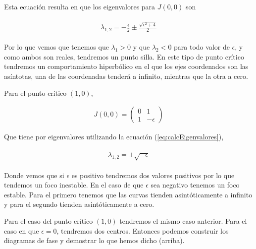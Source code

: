 \documentclass[a4paper,10pt]{article}
\begin{document}
Esta ecuación resulta en que los eigenvalores para $J(0,0)$ son

\begin{align}
 \begin{split}
  \lambda_{1,2} = - \frac{\epsilon}{2} \pm \frac{\sqrt{\epsilon^2 + 4}}{2}
 \end{split}
\end{align}

Por lo que vemos que tenemos que $\lambda_1 > 0$ y que $\lambda_2 < 0$ para todo valor
de $\epsilon$, y como ambos son reales, tendremos un punto silla. En este tipo de punto
crítico tendremos un comportamiento hiperbólico en el que los ejes coordenados son 
las asíntotas, una de las coordenadas tenderá a infinito, mientras que la otra a cero.

Para el punto crítico $(1,0)$,

\begin{align}
J(0,0) = \begin{pmatrix}
     0 & 1 \\
     1 & -\epsilon
\end{pmatrix}
\label{eq:jacobiana3s}
\end{align}

Que tiene por eigenvalores utilizando la ecuación (\ref{eq:calcEigenvalores}),

\begin{align}
 \begin{split}
  \lambda_{1,2} = \pm \sqrt{-\epsilon}
 \end{split}
\end{align}

Donde vemos que si $\epsilon$ es positivo tendremos dos valores positivos por lo
que tendemos un foco inestable. En el caso de que $\epsilon$ sea negativo tenemos un
foco estable. Para el primero tenemos que las curvas tienden asintóticamente a infinito y para el segundo
tienden asintóticamente a cero. 

\vspace{.3cm}

Para el caso del punto crítico $(1,0)$ tendremos el mismo caso anterior. Para
el caso en que $\epsilon = 0$, tendremos dos centros. Entonces podemos construir 
los diagramas de fase y demostrar lo que hemos dicho (arriba).
\end{document}
